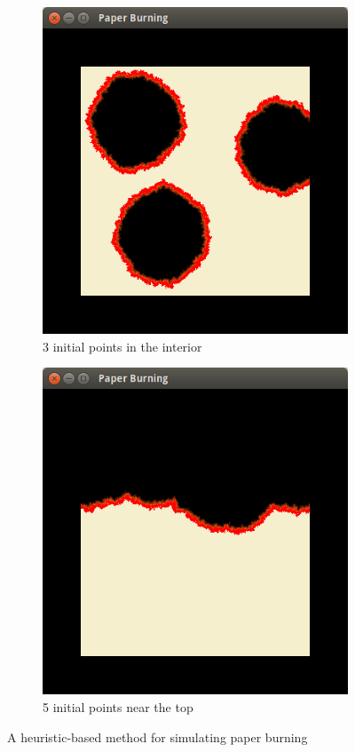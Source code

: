 \documentclass[a4paper]{report}
\begin{document}
\begin{figure}[H]
\centering
\begin{subfigure}{.48\textwidth}
  \centering
  \includegraphics[width=\linewidth]{paper1}
  \caption{3 initial points in the interior}
\end{subfigure}
\begin{subfigure}{.48\textwidth}
  \centering
  \includegraphics[width=\linewidth]{paper2}
  \caption{5 initial points near the top}
\end{subfigure}
\caption{A heuristic-based method for simulating paper burning}
\end{figure}
\end{document}
